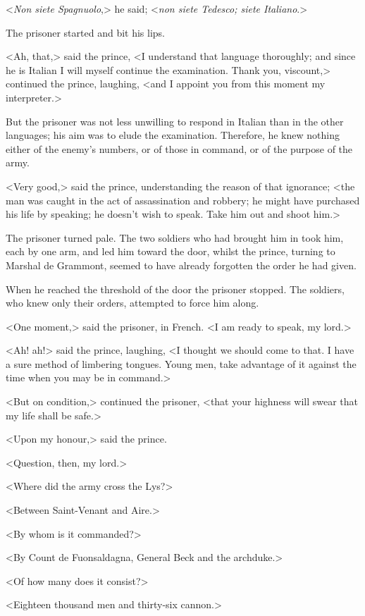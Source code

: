 <\textit{Non siete Spagnuolo},> he said; <\textit{non siete Tedesco; siete Italiano}.>

The prisoner started and bit his lips.

<Ah, that,> said the prince, <I understand that language thoroughly; and since he is Italian I will myself continue the examination. Thank you, viscount,> continued the prince, laughing, <and I appoint you from this moment my interpreter.>

But the prisoner was not less unwilling to respond in Italian than in the other languages; his aim was to elude the examination. Therefore, he knew nothing either of the enemy's numbers, or of those in command, or of the purpose of the army.

<Very good,> said the prince, understanding the reason of that ignorance; <the man was caught in the act of assassination and robbery; he might have purchased his life by speaking; he doesn't wish to speak. Take him out and shoot him.>

The prisoner turned pale. The two soldiers who had brought him in took him, each by one arm, and led him toward the door, whilst the prince, turning to Marshal de Grammont, seemed to have already forgotten the order he had given.

When he reached the threshold of the door the prisoner stopped. The soldiers, who knew only their orders, attempted to force him along.

<One moment,> said the prisoner, in French. <I am ready to speak, my lord.>

<Ah! ah!> said the prince, laughing, <I thought we should come to that. I have a sure method of limbering tongues. Young men, take advantage of it against the time when you may be in command.>

<But on condition,> continued the prisoner, <that your highness will swear that my life shall be safe.>

<Upon my honour,> said the prince.

<Question, then, my lord.>

<Where did the army cross the Lys?>

<Between Saint-Venant and Aire.>

<By whom is it commanded?>

<By Count de Fuonsaldagna, General Beck and the archduke.>

<Of how many does it consist?>

<Eighteen thousand men and thirty-six cannon.>

